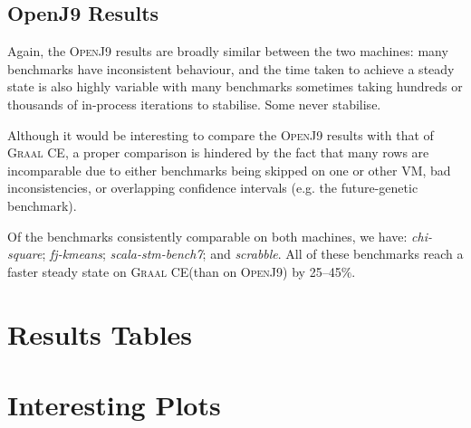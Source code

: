 \documentclass[a4paper]{article}
\newcommand{\graalce}{\textsc{Graal CE}\xspace}
\newcommand{\graalcehs}{\textsc{Graal CE Hotspot}\xspace}
\newcommand{\jnine}{\textsc{OpenJ9}\xspace}
\newcommand{\bencherseven}{Linux1$_\mathrm{1240v5}$\xspace}
\newcommand{\bencherten}{Linux2$_\mathrm{1240v6}$\xspace}
\begin{document}
\subsection{OpenJ9 Results}

Again, the \jnine results are broadly similar between the two machines: many
benchmarks have inconsistent behaviour, and the time taken to achieve a steady
state is also highly variable with many benchmarks sometimes taking hundreds or
thousands of in-process iterations to stabilise. Some never stabilise.

Although it would be interesting to compare the \jnine results with that of \graalce,
a proper comparison is hindered by the fact that many rows are incomparable due
to either benchmarks being skipped on one or other VM, bad inconsistencies, or
overlapping confidence intervals (e.g. the future-genetic benchmark).

Of the benchmarks consistently comparable on both machines, we have:
\emph{chi-square}; \emph{fj-kmeans}; \emph{scala-stm-bench7}; and
\emph{scrabble}. All of these benchmarks reach a faster steady state on
\graalce (than on \jnine) by 25--45$\%$.





\appendix

\newpage
\section{Results Tables}

\newcommand{\captionbsevengraalce}{Results for \graalce on \bencherseven.}


\newpage
\newcommand{\captionbsevengraalcehs}{Results for \graalcehs on \bencherseven.}


\newpage
\newcommand{\captionbsevenjnine}{Results for \jnine on \bencherseven.}


\newpage
\newcommand{\captionbtengraalce}{Results for \graalce on \bencherten.}


\newpage
\newcommand{\captionbtengraalcehs}{Results for \graalcehs on \bencherten.}


\newpage
\newcommand{\captionbtenjnine}{Results for \jnine on \bencherten.}


\section{Interesting Plots}
\end{document}
